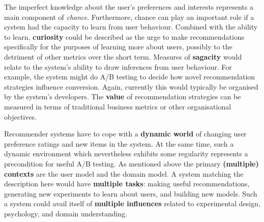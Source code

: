 The imperfect knowledge about the user's preferences and interests represents a main component of \emph{chance}. Furthermore, chance can play an important role if a system had the capacity to learn from user behaviour. Combined with the ability to learn, \textbf{curiosity} could be described as the urge to make recommendations specifically for the purposes of learning more about users, possibly to the detriment of other metrics over the short term. Measures of \textbf{sagacity} would relate to the system's ability to draw inferences from user behaviour.  For example, the system might do A/B testing to decide how novel recommendation strategies influence conversion.  Again, currently this would typically be organised by the system's developers.  The \textbf{value} of recommendation strategies can be measured in terms of traditional business metrics or other organisational objectives.

Recommender systems have to cope with a \textbf{dynamic world} of changing user preference ratings and new items in the system. At the same time, such a dynamic environment which nevertheless exhibits some regularity represents a precondition for useful A/B testing.  As mentioned above the primary \textbf{(multiple) contexts} are the user model and the domain model. A system matching the description here would have \textbf{multiple tasks}: making useful recommendations, generating new experiments to learn about users, and building new models. Such a system could avail itself of \textbf{multiple influences} related to
experimental design, psychology, and domain understanding.





